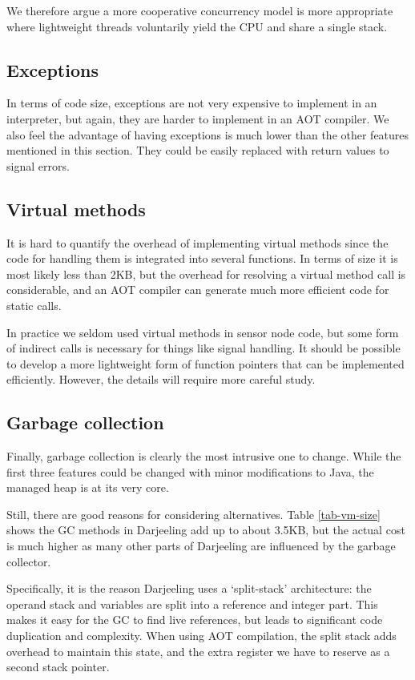 We therefore argue a more cooperative concurrency model is more appropriate where lightweight threads voluntarily yield the CPU and share a single stack.


\subsection{Exceptions}
In terms of code size, exceptions are not very expensive to implement in an interpreter, but again, they are harder to implement in an AOT compiler. We also feel the advantage of having exceptions is much lower than the other features mentioned in this section. They could be easily replaced with return values to signal errors.


\subsection{Virtual methods}
It is hard to quantify the overhead of implementing virtual methods since the code for handling them is integrated into several functions. In terms of size it is most likely less than 2KB, but the overhead for resolving a virtual method call is considerable, and an AOT compiler can generate much more efficient code for static calls.

In practice we seldom used virtual methods in sensor node code, but some form of indirect calls is necessary for things like signal handling. It should be possible to develop a more lightweight form of function pointers that can be implemented efficiently. However, the details will require more careful study.


\subsection{Garbage collection}
Finally, garbage collection is clearly the most intrusive one to change. While the first three features could be changed with minor modifications to Java, the managed heap is at its very core.

Still, there are good reasons for considering alternatives. Table \ref{tab-vm-size} shows the GC methods in Darjeeling add up to about 3.5KB, but the actual cost is much higher as many other parts of Darjeeling are influenced by the garbage collector.

Specifically, it is the reason Darjeeling uses a `split-stack' architecture: the operand stack and variables are split into a reference and integer part. This makes it easy for the GC to find live references, but leads to significant code duplication and complexity. When using AOT compilation, the split stack adds overhead to maintain this state, and the extra register we have to reserve as a second stack pointer.




